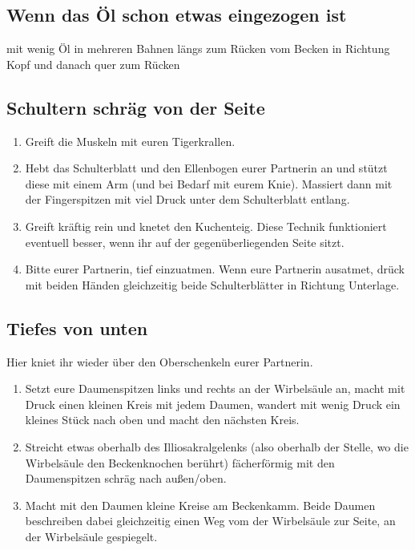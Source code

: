 \subsection{Wenn das Öl schon etwas eingezogen ist}
 mit wenig Öl in mehreren Bahnen längs zum Rücken vom Becken in Richtung Kopf und danach quer zum Rücken

\subsection{Schultern schräg von der Seite}
\begin{enumerate}
	\item {} Greift die Muskeln mit euren Tigerkrallen.
	\item {} Hebt das Schulterblatt und den Ellenbogen eurer Partnerin an und stützt diese mit einem Arm (und bei Bedarf mit eurem Knie). Massiert dann mit der Fingerspitzen mit viel Druck unter dem Schulterblatt entlang.
	\item {} Greift kräftig rein und knetet den Kuchenteig. Diese Technik funktioniert eventuell besser, wenn ihr auf der gegenüberliegenden Seite sitzt.
	\item {} Bitte eurer Partnerin, tief einzuatmen. Wenn eure Partnerin ausatmet, drück mit beiden Händen gleichzeitig beide Schulterblätter in Richtung Unterlage.
\end{enumerate}


\subsection{Tiefes von unten}

Hier kniet ihr wieder über den Oberschenkeln eurer Partnerin.

\begin{enumerate}
	\item {} Setzt eure Daumenspitzen links und rechts an der Wirbelsäule an, macht mit Druck einen kleinen Kreis mit jedem Daumen, wandert mit wenig Druck ein kleines Stück nach oben und macht den nächsten Kreis.
	\item {} Streicht etwas oberhalb des Illiosakralgelenks (also oberhalb der Stelle, wo die Wirbelsäule den Beckenknochen berührt) fächerförmig mit den Daumenspitzen schräg nach außen/oben.
	\item {} Macht mit den Daumen kleine Kreise am Beckenkamm. Beide Daumen beschreiben dabei gleichzeitig einen Weg vom der Wirbelsäule zur Seite, an der Wirbelsäule gespiegelt.
\end{enumerate}


